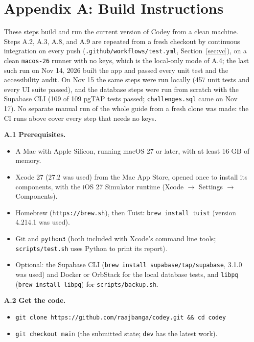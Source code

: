 \documentclass[12pt,letterpaper]{article}
\begin{document}
\section*{Appendix A: Build Instructions}\label{sec:appA}
These steps build and run the current version of Codey from a clean machine. Steps
A.2, A.3, A.8, and A.9 are repeated from a fresh checkout by continuous integration on
every push (\texttt{.github/workflows/test.yml}, Section~\ref{sec:vc}), on a clean
\texttt{macos-26} runner with no keys, which is the local-only mode of A.4; the last
such run on Nov 14, 2026 built the app and passed every unit test and the
accessibility audit. On Nov 15 the same steps were run locally (457 unit tests and
every UI suite passed), and the database steps were run from scratch with the
Supabase CLI (109 of 109 pgTAP tests passed; \texttt{challenges.sql} came on Nov 17). No separate manual run of the whole guide from a fresh clone was made: the
CI runs above cover every step that needs no keys.

\textbf{A.1 Prerequisites.}
\begin{itemize}
  \item A Mac with Apple Silicon, running macOS 27 or later, with at least
        16 GB of memory.
  \item Xcode 27 (27.2 was used) from the Mac App Store, opened once to install its components, with
        the iOS 27 Simulator runtime (Xcode $\to$ Settings $\to$ Components).
  \item Homebrew (\texttt{https://brew.sh}), then Tuist:
        \texttt{brew install tuist} (version 4.214.1 was used).
  \item Git and \texttt{python3} (both included with Xcode's command line tools;
        \texttt{scripts/test.sh} uses Python to print its report).
  \item Optional: the Supabase CLI (\texttt{brew install supabase/tap/supabase}, 3.1.0
        was used) and Docker or OrbStack for the local database tests, and
        \texttt{libpq} (\texttt{brew install libpq}) for \texttt{scripts/backup.sh}.
\end{itemize}

\textbf{A.2 Get the code.}
\begin{itemize}
  \item \texttt{git clone https://github.com/raajbanga/codey.git \&\& cd codey}
  \item \texttt{git checkout main} (the submitted state; \texttt{dev} has the latest work).
\end{itemize}
\end{document}
